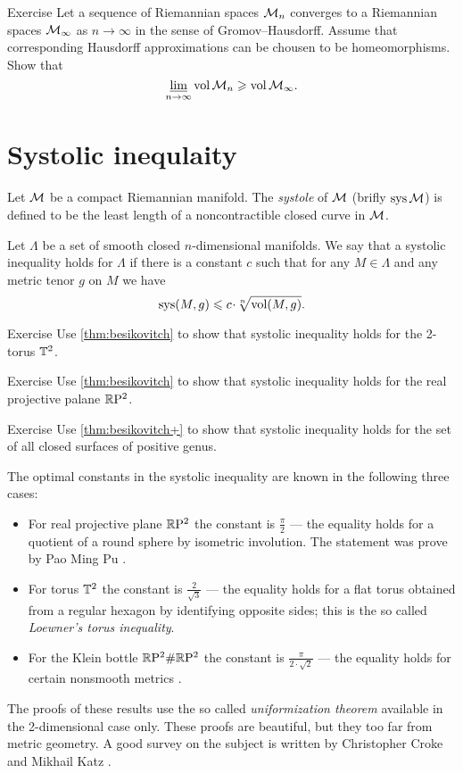 \begin{thm}{Exercise}\label{ex:GH-vol}
Let a sequence of Riemannian spaces $\mathcal{M}_n$ converges to a Riemannian spaces $\mathcal{M}_\infty$ as $n\to\infty$ in the sense of Gromov--Hausdorff.
Assume that corresponding Hausdorff approximations can be chousen to be homeomorphisms.
Show that 
\[\varliminf_{n\to\infty}\operatorname{\rm vol}\nolimits\mathcal{M}_n\geqslant \operatorname{\rm vol}\nolimits\mathcal{M}_\infty.\]

\end{thm}


\section{Systolic inequlaity}

Let $\mathcal{M}$ be a compact Riemannian manifold.
The \emph{systole} of $\mathcal{M}$ (brifly $\mathop{\rm sys}\nolimits\mathcal{M}$) is defined to be the least length of a noncontractible closed curve in $\mathcal{M}$.

Let $\Lambda$ be a set of smooth closed $n$-dimensional manifolds.
We say that a systolic inequality holds for $\Lambda$ if there is a constant $c$ such that for any $M\in \Lambda$ and any metric tenor $g$ on $M$ we have
\[\sys(M,g)\le c\cdot \sqrt[n]{\vol(M,g)}.\]

\begin{thm}{Exercise}\label{ex:sysT2}
Use \ref{thm:besikovitch} to show that systolic inequality holds for the 2-torus $\mathbb{T}^2$.
\end{thm}

\begin{thm}{Exercise}\label{ex:sysRP2}
Use \ref{thm:besikovitch} to show that systolic inequality holds for the real projective palane $\mathbb{R}\mathrm{P}^2$.
\end{thm}

\begin{thm}{Exercise}\label{ex:sysSg}
Use \ref{thm:besikovitch+} to show that systolic inequality holds for the set of all closed surfaces of positive genus.
\end{thm}

The optimal constants in the systolic inequality are known in the following three cases:
\begin{itemize}
\item For real projective plane $\mathbb{R}\mathrm{P}^2$ the constant is $\tfrac\pi2$ --- the equality holds for a quotient of a round sphere by isometric involution. The statement was prove by Pao Ming Pu \cite{pu}.\label{page:pu}
\item For torus $\mathbb{T}^2$ the constant is $\tfrac2{\sqrt{3}}$ --- the equality holds for a flat torus obtained from a regular hexagon by identifying opposite sides; this is the so called \emph{Loewner's torus inequality}.
\item For the Klein bottle $\mathbb{R}\mathrm{P}^2\#\mathbb{R}\mathrm{P}^2$  the constant is $\tfrac\pi{2\cdot\sqrt2}$ --- the equality holds for certain nonsmooth metrics \cite{bavard}.
\end{itemize}
The proofs of these results use the so called \emph{uniformization theorem}   available in the 2-dimensional case only.
These proofs are beautiful, but they too far from metric geometry.
A good survey on the subject is written by Christopher Croke and Mikhail Katz \cite{croke-katz}.

